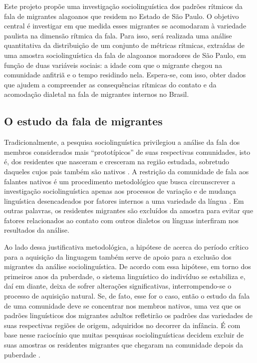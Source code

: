 \documentclass[
	a4paper,	%
	12pt,		%
	]{article}	%
\begin{document}
Este projeto propõe uma investigação sociolinguística dos padrões rítmicos da
fala de migrantes alagoanos que residem no Estado de São Paulo. O objetivo
central é investigar em que medida esses migrantes se acomodaram à variedade
paulista na dimensão rítmica da fala. Para isso, será realizada uma análise
quantitativa da distribuição de um conjunto de métricas rítmicas, extraídas de
uma amostra sociolinguística da fala de alagoanos moradores de São Paulo, em
função de duas variáveis sociais: a idade com que o migrante chegou na
comunidade anfitriã e o tempo residindo nela.  Espera-se, com isso, obter dados
que ajudem a compreender as consequências rítmicas do contato e da acomodação
dialetal na fala de migrantes internos no Brasil.

\subsection{O estudo da fala de migrantes}

Tradicionalmente, a pesquisa sociolinguística privilegiou a análise da fala
dos membros considerados mais \enquote{prototípicos} de suas respectivas
comunidades, isto é, dos residentes que nasceram e cresceram na região
estudada, sobretudo daqueles cujos pais também são nativos
\citep{Britain2018, Oushiro2018, Milroy2002, Kerswill1993}. A restrição da
comunidade de fala aos falantes nativos é um procedimento metodológico que
busca circunscrever a investigação sociolinguística apenas aos processos de
variação e de mudança linguística desencadeados por fatores internos a uma
variedade da língua \citep[][p.  20]{Milroy2002, Labov2001}. Em outras
palavras, os residentes migrantes são excluídos da amostra para evitar que
fatores relacionados ao contato com outros dialetos ou línguas interfiram
nos resultados da análise.

Ao lado dessa justificativa metodológica, a hipótese de \citet{Lenneberg1967}
acerca do período crítico para a aquisição da linguagem também serve de apoio
para a exclusão dos migrantes da análise sociolinguística. De acordo com essa
hipótese, em torno dos primeiros anos da puberdade, o sistema linguístico do
indivíduo se estabiliza e, daí em diante, deixa de sofrer alterações
significativas, interrompendo-se o processo de aquisição natural. Se, de fato,
esse for o caso, então o estudo da fala de uma comunidade deve se concentrar nos
membros nativos, uma vez que os padrões linguísticos dos migrantes adultos
refletirão os padrões das variedades de suas respectivas regiões de origem,
adquiridos no decorrer da infância. É com base nesse raciocínio que muitas
pesquisas sociolinguísticas decidem excluir de suas amostras os residentes
migrantes que chegaram na comunidade depois da puberdade \citep[p. ex.][p.
111]{Labov2006}.
\end{document}
